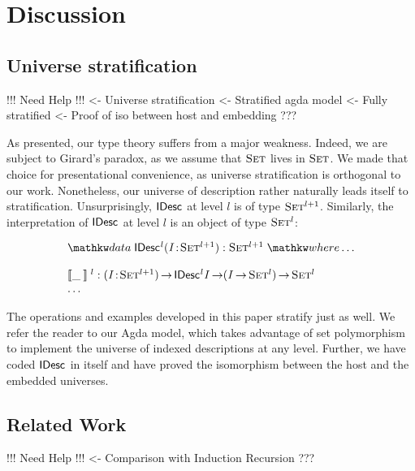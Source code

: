 \section{Discussion}
\label{sec:discussion}

\subsection{Universe stratification}

\begin{wstructure}
!!! Need Help !!!
<- Universe stratification
    <- Stratified agda model
        <- Fully stratified
        <- Proof of iso between host and embedding
    ???
\end{wstructure}

As presented, our type theory suffers from a major weakness. Indeed,
we are subject to Girard's paradox, as we assume that $\Set$ lives in
$\Set$. We made that choice for presentational convenience, as
universe stratification is orthogonal to our work. Nonetheless, our
universe of description rather naturally leads itself to
stratification. Unsurprisingly, $\IDesc{\!}$ at level $l$ is of type
$\Set^{\blue{l+1}}$. Similarly, the interpretation of $\IDesc{\!}$ at
level $l$ is an object of type $\Set^{\blue{l}}$:

\[\stk{
\data \IDesc{\!}^{\blue{l}} (\Bhab{\V{I}}{\Set^{\blue{l+1}}}) : \Set^{\blue{l+1}} \where \ldots \\
\\
\idescop{\_\:}{}{}^{\blue{l}} : \PI{\V{I}}{\Set^{\blue{l+1}}} \IDesc{{\!}^{\blue{l}}\V{I}} \To (\V{I} \To \Set^{\blue{l}}) \To \Set^{\blue{l}}    \\
\ldots
}\]

The operations and examples developed in this paper stratify just as
well. We refer the reader to our Agda model, which takes advantage of
set polymorphism to implement the universe of indexed descriptions at
any level. Further, we have coded $\IDesc{\!}$ in itself and have
proved the isomorphism between the host and the embedded universes.

\subsection{Related Work}

\begin{structure}
!!! Need Help !!!
<- Comparison with Induction Recursion
    ???
\end{structure}


